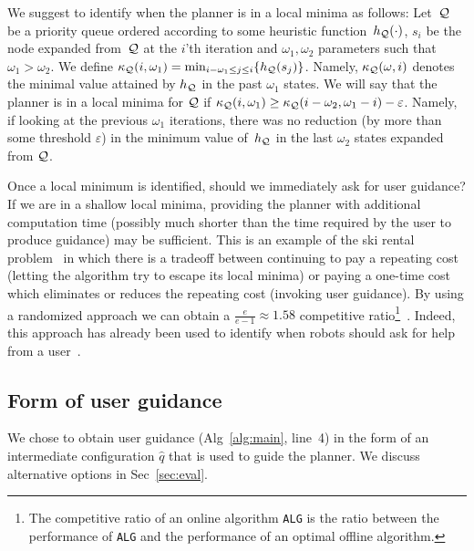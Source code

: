 \documentclass[conference]{IEEEtran}
\begin{document}
We suggest to identify when the planner is in a local minima as follows:
Let~$\mathcal{Q}$ be a priority queue 
ordered according to some heuristic function~$h_{\mathcal{Q}}(\cdot)$,
$s_i$ be the node expanded from~$\mathcal{Q}$ at the $i$'th iteration and $\omega_1, \omega_2$ parameters such that $\omega_1 > \omega_2$.
%
We define 
$\kappa_{\mathcal{Q}}(i, \omega_1) = \min_{i-\omega_1 \leq j \leq i} \{ h_{\mathcal{Q}}(s_j)\}$.
Namely, $\kappa_{\mathcal{Q}}(\omega,i)$ denotes the minimal value attained by $h_{\mathcal{Q}}$ in the past $\omega_1$ states. 
%
We will say that the planner is in a local minima for $\mathcal{Q}$ if 
$\kappa_{\mathcal{Q}}(i, \omega_1) \geq \kappa_{\mathcal{Q}}(i - \omega_2, \omega_1 - i) - \varepsilon$.
Namely, if looking at the previous $\omega_1$ iterations, 
there was no reduction 
(by more than some threshold $\varepsilon$) 
in the minimum value of~$h_{\mathcal{Q}}$ 
in the last $\omega_2$ states expanded from $\mathcal{Q}$.

%





Once a local minimum is identified, should we immediately ask for user guidance? If we are in a shallow local minima, providing the planner with additional computation time (possibly much shorter than the time required by the user to produce guidance) may be sufficient.
This is an example of the ski rental problem~\cite{KMMO94} in which there is a tradeoff between continuing to pay a repeating cost (letting the algorithm try to escape its local minima) or paying a one-time cost which eliminates or reduces the repeating cost (invoking user guidance).
By using a randomized approach we can obtain a $\frac{e}{e-1}\approx1.58$ competitive ratio\footnote{The competitive ratio of an online algorithm \texttt{ALG} is the ratio between the performance of \texttt{ALG} and the performance of an optimal offline algorithm.}~\cite{KMMO94}.
Indeed, this approach has already been used to identify when robots should ask for help from a user~\cite{RV12}.

\subsection{Form of user guidance}
\label{sec:q2}
We chose to obtain user guidance 
(Alg~\ref{alg:main}, line~4)
in the form of an intermediate configuration $\hat{q}$ that is used to guide the planner. We discuss alternative options in Sec~\ref{sec:eval}.
\end{document}
